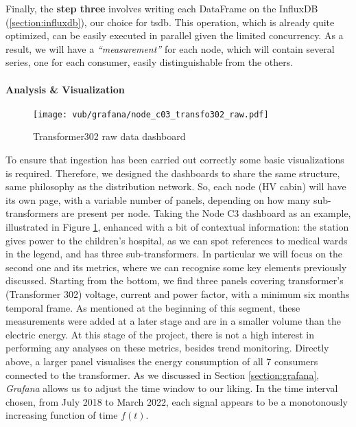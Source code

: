 Finally, the \textbf{step three} involves writing each DataFrame on the InfluxDB (\ref*{section:influxdb}), our choice for \acl{tsdb}.
This operation, which is already quite optimized, can be easily executed in parallel given the limited concurrency.
As a result, we will have a \textit{``measurement''} for each node, which will contain several series, one for each consumer, easily distinguishable from the others.

\paragraph{Analysis \& Visualization}
\begin{figure}[ht]
    \texttt{[image: vub/grafana/node\_c03\_transfo302\_raw.pdf]}
    \caption{Transformer302 raw data dashboard}
    \label{fig:vub_raw_rad}
\end{figure}
To ensure that ingestion has been carried out correctly some basic visualizations is required.
Therefore, we designed the dashboards to share the same structure, same philosophy as the distribution network.
So, each node (\ac{HV} cabin) will have its own page, with a variable number of panels, depending on how many sub-transformers are present per node.
Taking the Node C3 dashboard as an example, illustrated in Figure \ref{fig:vub_raw_rad}, enhanced with a bit of contextual information: 
the station gives power to the children's hospital, as we can spot references to medical wards in the legend, and has three sub-transformers.
In particular we will focus on the second one and its metrics, where we can recognise some key elements previously discussed.
Starting from the bottom, we find three panels covering transformer's (Transformer 302) voltage, current and power factor, with a minimum six months temporal frame.
As mentioned at the beginning of this segment, these measurements were added at a later stage and are in a smaller volume than the electric energy. 
At this stage of the project, there is not a high interest in performing any analyses on these metrics, besides trend monitoring. 
Directly above, a larger panel visualises the energy consumption of all 7 consumers connected to the transformer.
As we discussed in Section \ref{section:grafana}, \textit{Grafana} allows us to adjust the time window to our liking.
In the time interval chosen, from July 2018 to March 2022, each signal appears to be a monotonously increasing function of time $f(t)$. 
